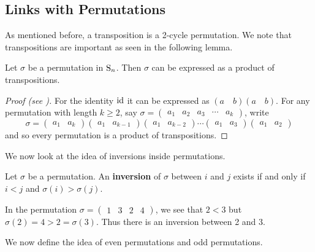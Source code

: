 \subsection{Links with Permutations}
As mentioned before, a transposition is a 2-cycle permutation. We note that transpositions are important as seen in the following lemma.
\begin{lemma}\label{lemma-permutations-as-product-of-transpositions}
    Let $\sigma$ be a permutation in $\mathrm{S}_{n}$. Then $\sigma$ can be expressed as a product of transpositions.
\end{lemma}
\begin{proof}[Proof (see {\cite[\S 80 Corollary]{clark_1984}})]
    For the identity $\mathrm{id}$ it can be expressed as $(a\quad b)(a \quad b)$. For any permutation with length $k \geq 2$, say $\sigma = \begin{pmatrix}a_1 & a_2 & a_3 & \cdots & a_k\end{pmatrix}$, write
    \[
        \sigma = \begin{pmatrix}a_1 & a_k\end{pmatrix}\begin{pmatrix}a_1 & a_{k-1}\end{pmatrix}\begin{pmatrix}a_1 & a_{k-2}\end{pmatrix}\cdots\begin{pmatrix}a_1 & a_3\end{pmatrix}\begin{pmatrix}a_1 & a_2\end{pmatrix}
    \]
    and so every permutation is a product of transpositions.
\end{proof}

We now look at the idea of inversions inside permutations.
\begin{definition}
    Let $\sigma$ be a permutation. An \textbf{inversion} of $\sigma$ between $i$ and $j$ exists if and only if $i < j$ and $\sigma(i) > \sigma(j)$.
\end{definition}

\begin{example}
    In the permutation $\sigma = \begin{pmatrix}1 & 3 & 2 & 4\end{pmatrix}$, we see that $2 < 3$ but $\sigma(2) = 4 > 2 = \sigma(3)$. Thus there is an inversion between 2 and 3.
\end{example}

We now define the idea of even permutations and odd permutations.

